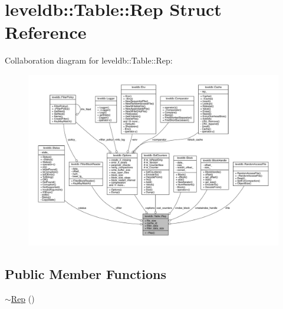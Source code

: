 \hypertarget{structleveldb_1_1_table_1_1_rep}{}\section{leveldb\+:\+:Table\+:\+:Rep Struct Reference}
\label{structleveldb_1_1_table_1_1_rep}


Collaboration diagram for leveldb\+:\+:Table\+:\+:Rep\+:
\nopagebreak
\begin{figure}[H]
\begin{center}
\leavevmode
\includegraphics[width=350pt]{structleveldb_1_1_table_1_1_rep__coll__graph}
\end{center}
\end{figure}
\subsection*{Public Member Functions}
\begin{DoxyCompactItemize}
\item 
\hyperlink{structleveldb_1_1_table_1_1_rep_a589eccb49554eb53054c95f5e6b5aac3}{$\sim$\+Rep} ()
\end{DoxyCompactItemize}

